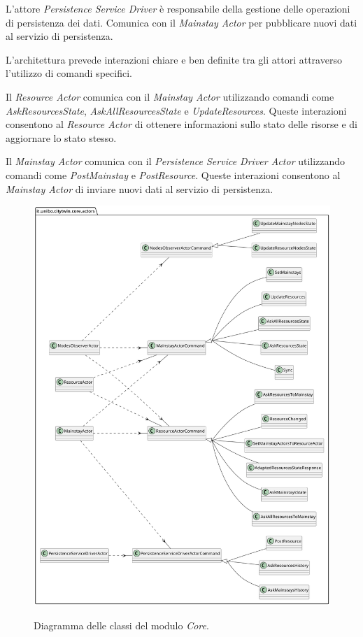 \documentclass{scrartcl}
\begin{document}
L'attore \textit{Persistence Service Driver} è responsabile della gestione delle operazioni di persistenza dei dati. Comunica con il \textit{Mainstay Actor} per pubblicare nuovi dati al servizio di persistenza.

L'architettura prevede interazioni chiare e ben definite tra gli attori attraverso l'utilizzo di comandi specifici.

Il \textit{Resource Actor} comunica con il \textit{Mainstay Actor} utilizzando comandi come \textit{AskResourcesState}, \textit{AskAllResourcesState} e \textit{UpdateResources}. Queste interazioni consentono al \textit{Resource Actor} di ottenere informazioni sullo stato delle risorse e di aggiornare lo stato stesso.

Il \textit{Mainstay Actor} comunica con il \textit{Persistence Service Driver Actor} utilizzando comandi come \textit{PostMainstay} e \textit{PostResource}. Queste interazioni consentono al \textit{Mainstay Actor} di inviare nuovi dati al servizio di persistenza.

\begin{figure}[h]
    \caption{Diagramma delle classi del modulo \textit{Core}.}
    \includegraphics[width=\textwidth]{../assets/images/core-class-diagram.png}
    \label{fig:core-class-diagram}
\end{figure}
\end{document}

